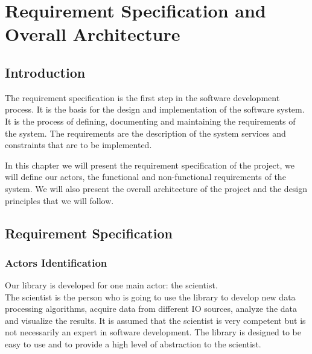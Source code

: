 
\setcounter{chapter}{1}
\chapter{Requirement Specification and Overall Architecture}
\minitoc %
\graphicspath{{Chapitre2/figures/}}


\pagestyle{fancy}
\fancyhf{}
\fancyhead[R]{\bfseries\rightmark}
\fancyfoot[R]{\thepage}
\renewcommand{\headrulewidth}{0.5pt}
\renewcommand{\footrulewidth}{0pt}
\renewcommand{\chaptermark}[1]{\markboth{\MakeUppercase{\chaptername~\thechapter. #1 }}{}}
\renewcommand{\sectionmark}[1]{\markright{\thechapter.\thesection~ #1}}

\begin{spacing}{1.2}
    \section*{Introduction}
    The requirement specification is the first step in the software development process.
    It is the basis for the design and implementation of the software system.
    It is the process of defining, documenting and maintaining the requirements of the system.
    The requirements are the description of the system services and constraints that are to be implemented.

    In this chapter we will present the requirement specification of the project, we will define our actors,
    the functional and non-functional requirements of the system.
    We will also present the overall architecture of the project and the design principles that we will follow.

    \section{Requirement Specification}

    \subsection{Actors Identification}
    Our library is developed for one main actor: the scientist.\\
    The scientist is the person who is going to use the library to develop new data processing algorithms,
    acquire data from different IO sources, analyze the data and visualize the results.
    It is assumed that the scientist is very competent but is not necessarily an expert in software development.
    The library is designed to be easy to use and to provide a high level of abstraction to the scientist.




\end{spacing}
